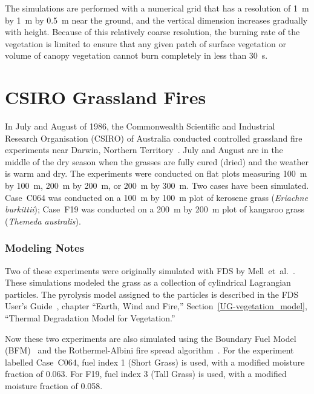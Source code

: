 The simulations are performed with a numerical grid that has a resolution of 1~m by 1~m by 0.5~m near the ground, and the vertical dimension increases gradually with height. Because of this relatively coarse resolution, the burning rate of the vegetation is limited to ensure that any given patch of surface vegetation or volume of canopy vegetation cannot burn completely in less than 30~s.





\section{CSIRO Grassland Fires}
\label{CSIRO_Grassland_Fires_Description}

In July and August of 1986, the Commonwealth Scientific and Industrial Research Organisation (CSIRO) of Australia conducted controlled grassland fire experiments near Darwin, Northern Territory~\cite{Cheney:IJWF1993}. July and August are in the middle of the dry season when the grasses are fully cured (dried) and the weather is warm and dry. The experiments were conducted on flat plots measuring 100~m by 100~m, 200~m by 200~m, or 200~m by 300~m. Two cases have been simulated. Case~C064 was conducted on a 100~m by 100~m plot of kerosene grass ({\it Eriachne burkittii}); Case~F19 was conducted on a 200~m by 200~m plot of kangaroo grass ({\it Themeda australis}).

\subsubsection{Modeling Notes}

Two of these experiments were originally simulated with FDS by Mell~et~al.~\cite{Mell:IJWF2007}. These simulations modeled the grass as a collection of cylindrical Lagrangian particles. The pyrolysis model assigned to the particles is described in the FDS User's Guide~\cite{FDS_Users_Guide}, chapter ``Earth, Wind and Fire,'' Section~\ref{UG-vegetation_model}, ``Thermal Degradation Model for Vegetation.''

Now these two experiments are also simulated using the Boundary Fuel Model (BFM)~\cite{Perez-Ramirez:FT2017} and the Rothermel-Albini fire spread algorithm~\cite{Rothermel:1972,Albini:1976}. For the experiment labelled Case~C064, fuel index 1 (Short Grass) is used, with a modified moisture fraction of 0.063. For F19, fuel index 3 (Tall Grass) is used, with a modified moisture fraction of 0.058.

